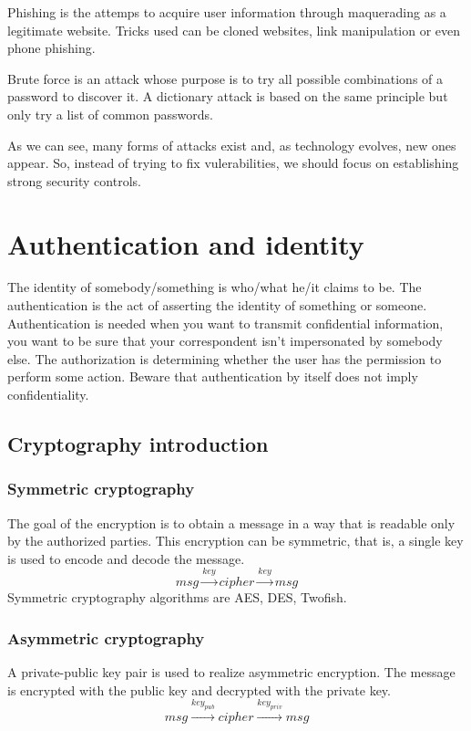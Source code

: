 Phishing is the attemps to acquire user information through maquerading as a
legitimate website. Tricks used can be cloned websites, link manipulation or
even phone phishing.

Brute force is an attack whose purpose is to try all possible combinations of
a password to discover it. A dictionary attack is based on the same principle
but only try a list of common passwords.

As we can see, many forms of attacks exist and, as technology evolves, new
ones appear. So, instead of trying to fix vulerabilities, we should focus on
establishing strong security controls.

\section{Authentication and identity}

The identity of somebody/something is who/what he/it claims to be.
The authentication is the act of asserting the identity of something or someone.
Authentication is needed when you want to transmit confidential
information, you want to be sure that your correspondent isn't
impersonated by somebody else.
The authorization is determining whether the user has the permission to perform some action.
Beware that authentication by itself does not imply confidentiality.

\subsection{Cryptography introduction}

\subsubsection{Symmetric cryptography}
The goal of the encryption is to obtain a message in a way that is readable
only by the authorized parties.
This encryption can be symmetric, that is, a single key is used to encode and
decode the message.
\[ msg \xrightarrow{key} cipher \xrightarrow{key} msg \]
Symmetric cryptography algorithms are AES, DES, Twofish.

\subsubsection{Asymmetric cryptography}
A private-public key pair is used to realize asymmetric encryption. The
message is encrypted with the public key and decrypted with the private key.
\[ msg \xrightarrow{key_{pub}} cipher \xrightarrow{key_{priv}} msg \]

